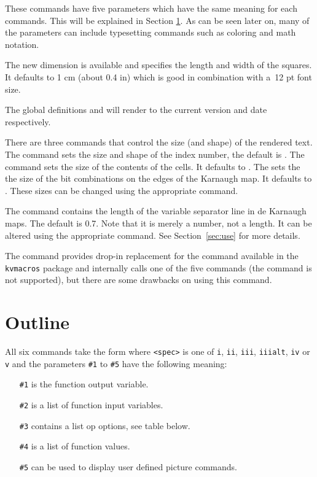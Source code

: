 \documentclass[a4paper,10pt]{ltxdoc}
\newcommand\Package[1]{\texttt{#1}}
\begin{document}
These commands have five parameters which have the same meaning for each
commands. This will be explained in Section \ref{sec:outline}. As can be seen
later on, many of the parameters can include typesetting commands such as
coloring and math notation.

The new dimension  is available and specifies the length
and width of the squares. It defaults to 1 cm (about 0.4 in) which is good in
combination with a~12 pt font size.

The global definitions  and  will render
to the current version and date respectively.

There are three commands that control the size (and shape) of the rendered
text. The  command sets the size and shape of the index
number, the default is . The  command sets
the size of the contents of the cells. It defaults to . The
 sets the the size of the bit combinations
on the edges of the Karnaugh map. It defaults to . These
sizes can be changed using the appropriate  command.

The command  contains the length of the variable separator
line in de Karnaugh maps. The default is 0.7. Note that it is merely a
number, not a length. It can be altered using the appropriate
 command. See Section~\ref{sec:use} for more details.

The command  provides drop-in replacement for the 
command available in the \Package{kvmacros} package and internally calls one
of the five commands (the  command is not supported), but
there are some drawbacks on using this command.

\section{Outline}
\label{sec:outline}
All six commands take the form
 where \texttt{<spec>} is
one of \texttt{i}, \texttt{ii}, \texttt{iii}, \texttt{iiialt}, \texttt{iv} or
\texttt{v} and the parameters \texttt{\#1} to \texttt{\#5} have the following
meaning:

\begin{itemize}
\itemsep0pt
\item[\texttt{\#1}] is the function output variable.
\item[\texttt{\#2}] is a list of function input variables.
\item[\texttt{\#3}] contains a list op options, see table below.
\item[\texttt{\#4}] is a list of function values.
\item[\texttt{\#5}] can be used to display user defined picture commands.
\end{itemize}
\end{document}

